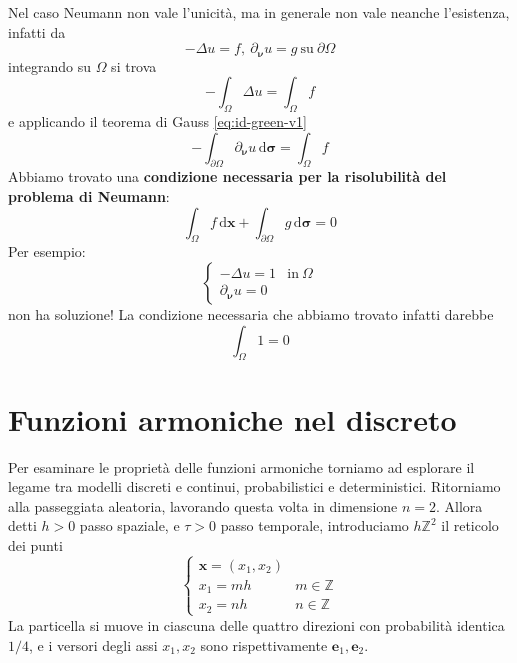 \documentclass[10pt,a4paper,twoside,openright]{book}
\newcommand{\x}{\mathbf{x}}
\newcommand{\sigg}{\bm{\sigma}}
\newcommand{\nuu}{\bm{\nu}}
\newcommand{\de}{\,\mathrm d}
\newcommand{\dxx}{\de \x}
\newcommand{\dsig}{\de \sigg}
\begin{document}
Nel caso Neumann non vale l'unicità, ma in generale non vale neanche l'esistenza, infatti da 
\begin{equation*}
	-\Delta u=f,\ \partial _{\nuu} u=g\ \text{su} \ \partial \Omega 
\end{equation*}
integrando su $\displaystyle \Omega $ si trova
\begin{equation*}
	-\int _{\Omega } \Delta u=\int _{\Omega } f
\end{equation*}
e applicando il teorema di Gauss \eqref{eq:id-green-v1}
\begin{equation*}
-\int _{\partial \Omega } \partial_{\nuu} u\dsig =\int _{\Omega } f
\end{equation*}
Abbiamo trovato una \textbf{condizione necessaria per la risolubilità del problema di Neumann}:
\begin{equation}
\boxed{\int _{\Omega } f\dxx+\int _{\partial \Omega } g\dsig =0}
\end{equation}
Per esempio:
\begin{equation*}
	\begin{cases}
		-\Delta u=1          & \text{in} \ \Omega \\
		\partial _{\nuu} u=0 &                    
	\end{cases}
\end{equation*}
non ha soluzione! La condizione necessaria che abbiamo trovato infatti darebbe
\begin{equation*}
	\int _{\Omega } 1=0
\end{equation*}
\section{Funzioni armoniche nel discreto}

Per esaminare le proprietà delle funzioni armoniche torniamo ad esplorare il legame tra modelli discreti e continui, probabilistici e deterministici. Ritorniamo alla passeggiata aleatoria, lavorando questa volta in dimensione $n=2$. Allora detti $h >0$ passo spaziale, e $\displaystyle \tau  >0$ passo temporale, introduciamo $\displaystyle h\mathbb{Z}^{2}$ il reticolo dei punti 
\begin{equation*}
	\begin{cases}
		\x=(x_{1},x_{2}) &                 \\
		x_{1} =mh         & m\in \mathbb{Z} \\
		x_{2} =nh         & n\in \mathbb{Z} 
	\end{cases}
\end{equation*}
La particella si muove in ciascuna delle quattro direzioni con probabilità identica $1/4$, e i versori degli assi $\displaystyle x_{1},x_{2}$ sono rispettivamente $\displaystyle \mathbf{e}_{1},\mathbf{e}_{2}$.
\end{document}
